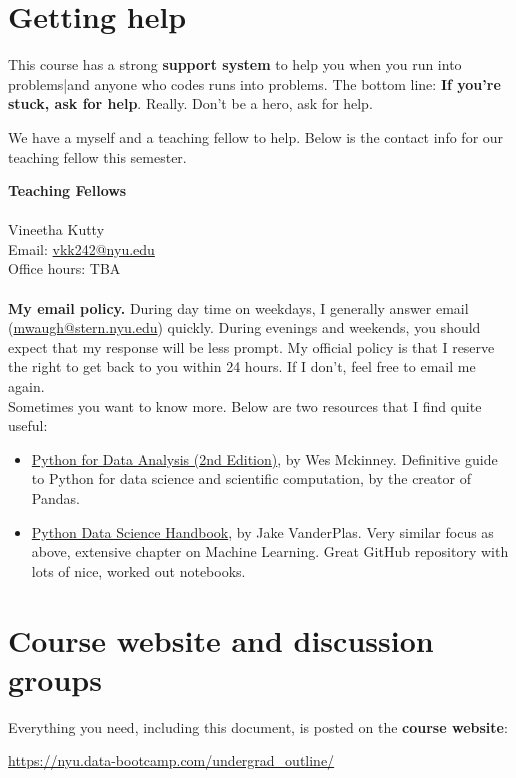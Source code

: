 \section*{Getting help}

This course has a strong {\bf support system\/} to help you when you run into problems|and anyone who codes runs into problems. The bottom line:  {\bf If you're stuck, ask for help\/}.
Really.  Don't be a hero, ask for help.

We have a myself and a teaching fellow to help. Below is the contact info for our teaching fellow this semester.

\textbf{Teaching Fellows}\\
\\
Vineetha Kutty \\
Email: \href{mailto:vkk242@nyu.edu}{vkk242@nyu.edu}\\
Office hours: TBA\\
\\
\textbf{My email policy.} During day time on weekdays, I generally answer email (\href{mailto:mwaugh@stern.nyu.edu}{mwaugh@stern.nyu.edu}) quickly. During evenings and weekends, you should expect that my response will be less prompt. My official policy is that I reserve the right to get back to you within 24 hours. If I don't, feel free to email me again.\\

Sometimes you want to know more. Below are two resources that I find quite useful:
\begin{itemize}
\item \href{https://www.amazon.com/Python-Data-Analysis-Wrangling-IPython/dp/1491957662/}{Python for Data Analysis (2nd Edition)}, by Wes Mckinney. Definitive guide to Python for data science and scientific computation, by the creator of Pandas.
\item \href{https://www.amazon.com/Python-Data-Science-Handbook-Essential/dp/1491912057/}{Python Data Science Handbook}, by Jake VanderPlas. Very similar focus as above, extensive chapter on Machine Learning. Great GitHub repository with lots of nice, worked out notebooks.
\end{itemize}


\section*{Course website and discussion groups}

Everything you need, including this document, is posted on
the {\bf course website\/}:
%
\vspace{-0.15in}
\begin{center}
\url{https://nyu.data-bootcamp.com/undergrad_outline/}
\end{center}
\vspace{-0.15in}

